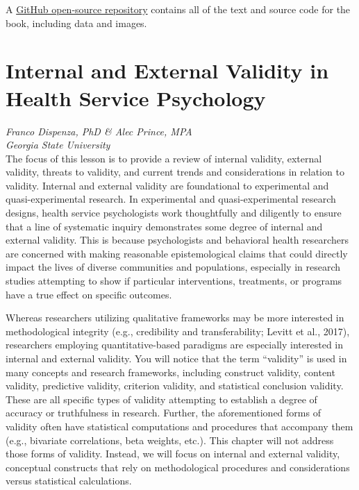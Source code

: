 \documentclass[
  11pt,
]{book}
\begin{document}
A \href{https://github.com/lhbikos/ReC_MultivModel}{GitHub open-source repository} contains all of the text and source code for the book, including data and images.

\hypertarget{InExVal}{%
\chapter{Internal and External Validity in Health Service Psychology}\label{InExVal}}

\emph{Franco Dispenza, PhD \& Alec Prince, MPA}\\
\emph{Georgia State University}\\

The focus of this lesson is to provide a review of internal validity, external validity, threats to validity, and current trends and considerations in relation to validity. Internal and external validity are foundational to experimental and quasi-experimental research. In experimental and quasi-experimental research designs, health service psychologists work thoughtfully and diligently to ensure that a line of systematic inquiry demonstrates some degree of internal and external validity. This is because psychologists and behavioral health researchers are concerned with making reasonable epistemological claims that could directly impact the lives of diverse communities and populations, especially in research studies attempting to show if particular interventions, treatments, or programs have a true effect on specific outcomes.

Whereas researchers utilizing qualitative frameworks may be more interested in methodological integrity (e.g., credibility and transferability; Levitt et al., 2017), researchers employing quantitative-based paradigms are especially interested in internal and external validity. You will notice that the term ``validity'' is used in many concepts and research frameworks, including construct validity, content validity, predictive validity, criterion validity, and statistical conclusion validity. These are all specific types of validity attempting to establish a degree of accuracy or truthfulness in research. Further, the aforementioned forms of validity often have statistical computations and procedures that accompany them (e.g., bivariate correlations, beta weights, etc.). This chapter will not address those forms of validity. Instead, we will focus on internal and external validity, conceptual constructs that rely on methodological procedures and considerations versus statistical calculations.
\end{document}
